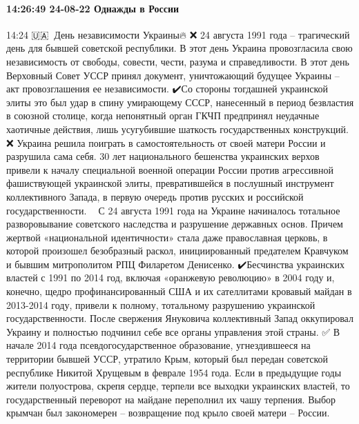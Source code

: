  
 
 
 
 

\paragraph{14:26:49 24-08-22 Однажды в России}

14:24
🇺🇦🏴‍☠️День независимости Украины🔥
❌ 24 августа 1991 года – трагический день для бывшей советской республики. В этот день Украина провозгласила свою независимость от свободы, совести, чести, разума и справедливости. В этот день Верховный Совет УССР принял документ, уничтожающий будущее Украины – акт провозглашения ее независимости.
✔️Со стороны тогдашней украинской элиты это был удар в спину умирающему СССР, нанесенный в период безвластия в союзной столице, когда непонятный орган ГКЧП предпринял неудачные хаотичные действия, лишь усугубившие шаткость государственных конструкций.
❌ Украина решила поиграть в самостоятельность от своей матери России и разрушила сама себя. 30 лет национального бешенства украинских верхов привели к началу специальной военной операции России против агрессивной фашиствующей украинской элиты, превратившейся в послушный инструмент коллективного Запада, в первую очередь против русских и российской государственности.
🏴‍☠️ С 24 августа 1991 года на Украине начиналось тотальное разворовывание советского наследства и разрушение державных основ. Причем жертвой «национальной идентичности» стала даже православная церковь, в которой произошел безобразный раскол, инициированный предателем Кравчуком и бывшим митрополитом РПЦ Филаретом Денисенко.
✔️Бесчинства украинских властей с 1991 по 2014 год, включая «оранжевую революцию» в 2004 году и, конечно, щедро профинансированный США и их сателлитами кровавый майдан в 2013-2014 году, привели к полному, тотальному разрушению украинской государственности. После свержения Януковича коллективный Запад оккупировал Украину и полностью подчинил себе все органы управления этой страны.
✅ В начале 2014 года псевдогосударственное образование, угнездившееся на территории бывшей УССР, утратило Крым, который был передан советской республике Никитой Хрущевым в феврале 1954 года. Если в предыдущие годы жители полуострова, скрепя сердце, терпели все выходки украинских властей, то государственный переворот на майдане переполнил их чашу терпения. Выбор крымчан был закономерен – возвращение под крыло своей матери – России.
